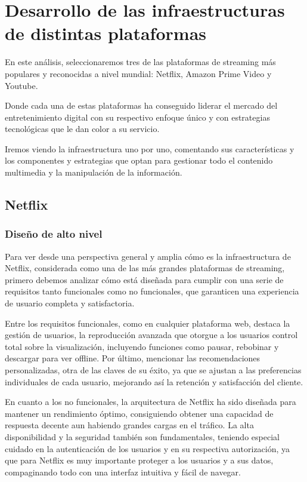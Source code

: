 \documentclass[12pt,a4paper]{article}
\begin{document}
\newpage

\section{Desarrollo de las infraestructuras de distintas plataformas}
En este análisis, seleccionaremos tres de las plataformas de streaming más populares y reconocidas a nivel mundial: Netflix, Amazon Prime Video y Youtube. 

Donde cada una de estas plataformas ha conseguido liderar el mercado del entretenimiento digital con su respectivo enfoque único y con estrategias tecnológicas que le dan color a su servicio.

Iremos viendo la infraestructura uno por uno, comentando sus características y los componentes y estrategias que optan para gestionar todo el contenido multimedia y la manipulación de la información.

    \subsection{Netflix}

    \subsubsection{Diseño de alto nivel}

    Para ver desde una perspectiva general y amplia cómo es la infraestructura de Netflix, considerada como una de las más grandes plataformas de streaming, primero debemos analizar cómo está diseñada para cumplir con una serie de requisitos tanto funcionales como no funcionales, que garanticen una experiencia de usuario completa y satisfactoria. 

    Entre los requisitos funcionales, como en cualquier plataforma web, destaca la gestión de usuarios, la reproducción avanzada que otorgue a los usuarios control total sobre la visualización, incluyendo funciones como pausar, rebobinar y descargar para ver offline. Por último, mencionar las recomendaciones personalizadas, otra de las claves de su éxito, ya que se ajustan a las preferencias individuales de cada usuario, mejorando así la retención y satisfacción del cliente.

    En cuanto a los no funcionales, la arquitectura de Netflix ha sido diseñada para mantener un rendimiento óptimo, consiguiendo obtener una capacidad de respuesta decente aun habiendo grandes cargas en el tráfico. La alta disponibilidad y la seguridad también son fundamentales, teniendo especial cuidado en la autenticación de los usuarios y en su respectiva autorización, ya que para Netflix es muy importante proteger a los usuarios y a sus datos, compaginando todo con una interfaz intuitiva y fácil de navegar. \cite{adm2023}
\end{document}
